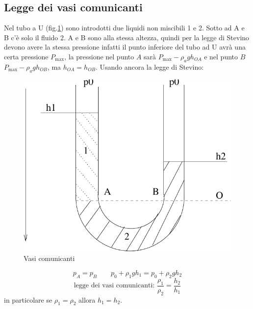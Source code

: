 \subsection{Legge dei vasi comunicanti}
Nel tubo a U (fig.\@\ref{vasicom}) sono introdotti due liquidi non miscibili 1 e 2. Sotto ad A e B c'è solo il fluido 2. A e B sono alla stessa altezza, quindi per la legge di Stevino devono avere la stessa pressione infatti il punto inferiore del tubo ad U avrà una certa pressione $P_{\max}$, la pressione nel punto $A$ sarà $P_{\max} - \rho_a g h_{OA}$ e nel punto $B$ $P_{\max} - \rho_a g h_{OB}$, ma $h_{OA}=h_{OB}$. Usando ancora la legge di Stevino:
\begin{figure}[htbp]
\centering
\includegraphics[scale=0.5]{immagini/fisica1/vasi_comunicanti}
\caption{Vasi comunicanti}
\label{vasicom}
\end{figure}
\[p_A=p_B\qquad p_0+\rho_1 gh_1=p_0+\rho_2gh_2\]
\[\text{legge dei vasi comunicanti: }\frac{\rho_1}{\rho_2}=\frac{h_2}{h_1}\]
in particolare se $\rho_1=\rho_2$ allora $h_1=h_2$.
